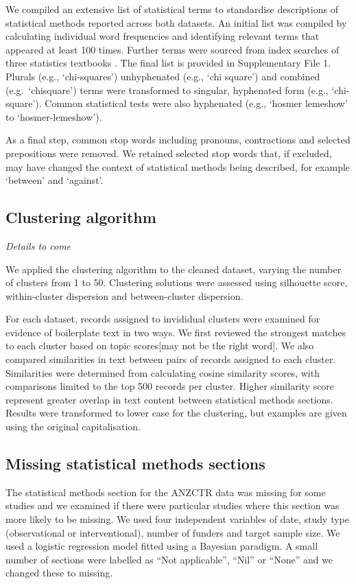 \documentclass[12pt]{article}
\begin{document}
We compiled an extensive list of statistical terms to standardise
descriptions of statistical methods reported across both datasets. An
initial list was compiled by calculating individual word frequencies and
identifying relevant terms that appeared at least 100 times. Further
terms were sourced from index searches of three statistics textbooks
\citep[\citet{Diggle2013},\citet{Bland2015}]{Dobson2018}. The final list
is provided in Supplementary File 1. Plurals (e.g., `chi-squares')
unhyphenated (e.g., `chi square') and combined (e.g.~`chisquare') terms
were transformed to singular, hyphenated form (e.g., `chi-square').
Common statistical tests were also hyphenated (e.g., `hosmer lemeshow'
to `hosmer-lemeshow').

As a final step, common stop words including pronouns, contractions and
selected prepositions were removed. We retained selected stop words
that, if excluded, may have changed the context of statistical methods
being described, for example `between' and `against'.

\subsection{Clustering algorithm}

\emph{Details to come}

We applied the clustering algorithm to the cleaned dataset, varying the
number of clusters from 1 to 50. Clustering solutions were assessed
using silhouette score, within-cluster dispersion and between-cluster
dispersion.

For each dataset, records assigned to invididual clusters were examined
for evidence of boilerplate text in two ways. We first reviewed the
strongest matches to each cluster based on topic scores{[}may not be the
right word{]}. We also compared similarities in text between pairs of
records assigned to each cluster. Similarities were determined from
calculating cosine similarity scores, with comparisons limited to the
top 500 records per cluster. Higher similarity score represent greater
overlap in text content between statistical methods sections. Results
were transformed to lower case for the clustering, but examples are
given using the original capitalisation.

\subsection{Missing statistical methods sections}

The statistical methods section for the ANZCTR data was missing for some
studies and we examined if there were particular studies where this
section was more likely to be missing. We used four independent
variables of date, study type (observational or interventional), number
of funders and target sample size. We used a logistic regression model
fitted using a Bayesian paradigm. A small number of sections were
labelled as ``Not applicable'', ``Nil'' or ``None'' and we changed these
to missing.
\end{document}
